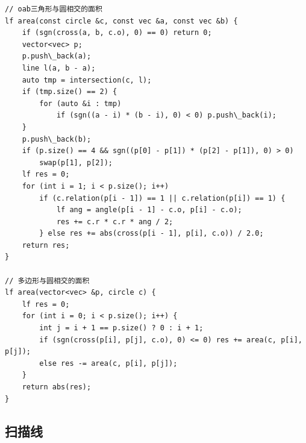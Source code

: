 \documentclass[UTF8]{ctexart}
\begin{document}
\begin{sloppypar}
\begin{lstlisting}[style=cpp]
// oab三角形与圆相交的面积
lf area(const circle &c, const vec &a, const vec &b) {
    if (sgn(cross(a, b, c.o), 0) == 0) return 0;
    vector<vec> p;
    p.push\_back(a);
    line l(a, b - a);
    auto tmp = intersection(c, l);
    if (tmp.size() == 2) {
        for (auto &i : tmp)
            if (sgn((a - i) * (b - i), 0) < 0) p.push\_back(i);
    }
    p.push\_back(b);
    if (p.size() == 4 && sgn((p[0] - p[1]) * (p[2] - p[1]), 0) > 0)
        swap(p[1], p[2]);
    lf res = 0;
    for (int i = 1; i < p.size(); i++)
        if (c.relation(p[i - 1]) == 1 || c.relation(p[i]) == 1) {
            lf ang = angle(p[i - 1] - c.o, p[i] - c.o);
            res += c.r * c.r * ang / 2;
        } else res += abs(cross(p[i - 1], p[i], c.o)) / 2.0;
    return res;
}

// 多边形与圆相交的面积
lf area(vector<vec> &p, circle c) {
    lf res = 0;
    for (int i = 0; i < p.size(); i++) {
        int j = i + 1 == p.size() ? 0 : i + 1;
        if (sgn(cross(p[i], p[j], c.o), 0) <= 0) res += area(c, p[i], p[j]);
        else res -= area(c, p[i], p[j]);
    }
    return abs(res);
}
\end{lstlisting}

\subsection{扫描线}


\end{sloppypar}
\end{document}
